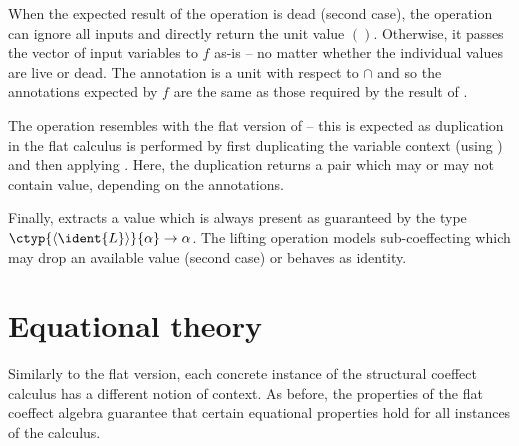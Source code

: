\noindent
When the expected result of the  operation is dead (second case), the operation can
ignore all inputs and directly return the unit value $()$. Otherwise, it passes the vector of 
input variables to $f$ as-is -- no matter whether the individual values are live or dead. The
 annotation is a unit with respect to $\cap$ and so the annotations expected by $f$ are
the same as those required by the result of .

The  operation resembles with the flat version of  -- this is expected as
duplication in the flat calculus is performed by first duplicating the variable context (using 
) and then applying . Here, the duplication returns a pair which may or
may not contain value, depending on the annotations.

Finally,  extracts a value which is always present as guaranteed by the type
$\ctyp{\langle \ident{L} \rangle}{\alpha} \rightarrow \alpha$. The lifting operation models 
sub-coeffecting which may drop an available value (second case) or behaves as identity.


%                                                                   
%

\section{Equational theory}
\label{sec:struct-syntax}

Similarly to the flat version, each concrete instance of the structural coeffect calculus has a 
different notion of context. As before, the properties of the flat coeffect algebra guarantee that 
certain equational properties hold for all instances of the calculus.

